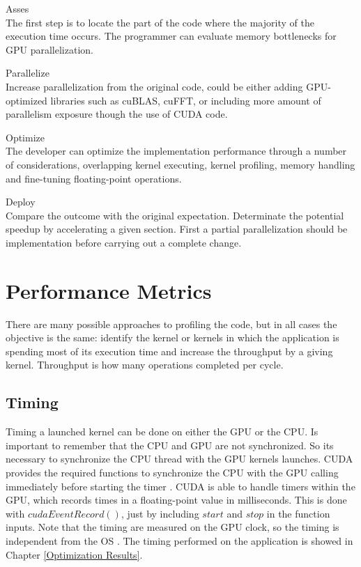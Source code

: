\begin{description}

 \item{Asses} \hfill \\
 The first step is to locate the part of the code where the majority of the execution time occurs. The programmer can evaluate memory bottlenecks for GPU parallelization.
 \item{Parallelize} \hfill \\
 Increase parallelization from the original code, could be either adding GPU-optimized libraries such as cuBLAS, cuFFT, or including more amount of parallelism exposure though the use of CUDA code.
 \item{Optimize} \hfill \\
The developer can optimize the implementation performance through a number of considerations, overlapping kernel executing, kernel profiling, memory handling and fine-tuning floating-point operations.
 \item{Deploy} \hfill \\
 Compare the outcome with the original expectation. Determinate the potential speedup by accelerating a given section. First a partial parallelization should be implementation before carrying out a complete change.
 \end{description}

\section{Performance Metrics}

There are many possible approaches to profiling the code, but in all cases the objective is the same:  identify the kernel or kernels in which the application is spending most of its execution time and increase the throughput by a giving kernel. Throughput is how many operations completed per cycle.

\subsection{Timing}

Timing a launched kernel can be done on either the GPU or the CPU. Is important to remember that the CPU and GPU are not synchronized. So its necessary to synchronize the CPU thread with the GPU kernels launches. CUDA provides the required  functions to synchronize the CPU with the GPU calling immediately before starting the timer \cite{practices}. CUDA is able to handle timers within the GPU, which records times in a floating-point value in milliseconds. This is done with $cudaEventRecord()$, just by including $start$ and $stop$ in the function inputs. Note that the timing are measured on the GPU clock, so the timing is independent from the OS \cite{cook}. The timing performed on the application is showed in Chapter \ref{Optimization Results}.

